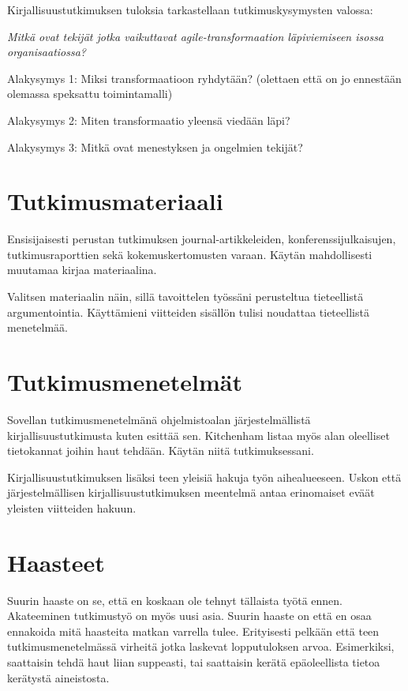 \documentclass[12pt,a4paper,finnish,oneside]{article}
\begin{document}
Kirjallisuustutkimuksen tuloksia tarkastellaan tutkimuskysymysten valossa:

\textit{Mitkä ovat tekijät jotka vaikuttavat agile-transformaation läpiviemiseen isossa
organisaatiossa?}

Alakysymys 1: Miksi transformaatioon ryhdytään? (olettaen että on jo ennestään olemassa speksattu toimintamalli)

Alakysymys 2: Miten transformaatio yleensä viedään läpi?

Alakysymys 3: Mitkä ovat menestyksen ja ongelmien tekijät?



\section{Tutkimusmateriaali}

Ensisijaisesti perustan tutkimuksen journal-artikkeleiden,
konferenssijulkaisujen, tutkimusraporttien sekä kokemuskertomusten varaan.
Käytän mahdollisesti muutamaa kirjaa materiaalina.

Valitsen materiaalin näin, sillä tavoittelen työssäni perusteltua tieteellistä
argumentointia. Käyttämieni viitteiden sisällön tulisi noudattaa tieteellistä
menetelmää.


\section{Tutkimusmenetelmät}

Sovellan tutkimusmenetelmänä ohjelmistoalan järjestelmällistä
kirjallisuustutkimusta kuten \cite{Kitchenham2007} esittää sen.
Kitchenham listaa myös alan oleelliset tietokannat joihin haut tehdään. Käytän
niitä tutkimuksessani.

Kirjallisuustutkimuksen lisäksi teen yleisiä hakuja työn aihealueeseen. Uskon
että järjestelmällisen kirjallisuustutkimuksen meentelmä antaa erinomaiset
eväät yleisten viitteiden hakuun.

\section{Haasteet}

Suurin haaste on se, että en koskaan ole tehnyt tällaista työtä ennen.
Akateeminen tutkimustyö on myös uusi asia. Suurin haaste on että en osaa
ennakoida mitä haasteita matkan varrella tulee. Erityisesti pelkään että teen
tutkimusmenetelmässä virheitä jotka laskevat lopputuloksen arvoa. Esimerkiksi,
saattaisin tehdä haut liian suppeasti, tai saattaisin kerätä epäoleellista
tietoa kerätystä aineistosta.
\end{document}

